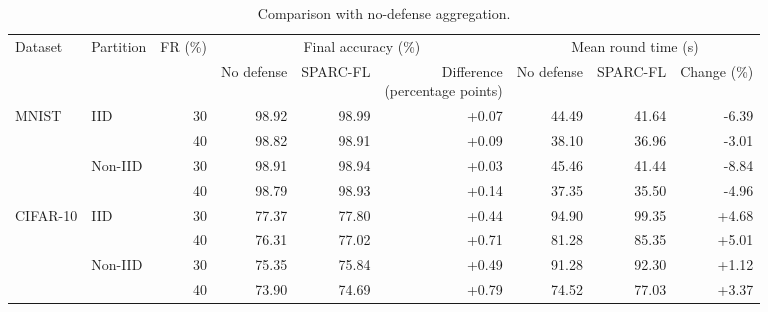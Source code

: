 \begin{table}[t]\centering\footnotesize\setlength{\tabcolsep}{5pt}
\caption{Comparison with no-defense aggregation.}\label{tab:baseline}
\begin{tabular}{llrrrrrrr}\toprule
\multirow{2}{*}{Dataset} & \multirow{2}{*}{Partition} & \multirow{2}{*}{FR (\%)} & \multicolumn{3}{c}{Final accuracy (\%)} & \multicolumn{3}{c}{Mean round time (s)} \\
\cmidrule(lr){4-6}\cmidrule(lr){7-9}
& & & No defense & SPARC-FL & \shortstack{Difference\\(percentage points)} & No defense & SPARC-FL & Change (\%) \\ \midrule
\multirow{4}{*}{MNIST} & \multirow{2}{*}{IID} & 30 & 98.92 & 98.99 & +0.07 & 44.49 & 41.64 & -6.39 \\
 &  & 40 & 98.82 & 98.91 & +0.09 & 38.10 & 36.96 & -3.01 \\
\cmidrule(lr){2-9}
 & \multirow{2}{*}{Non-IID} & 30 & 98.91 & 98.94 & +0.03 & 45.46 & 41.44 & -8.84 \\
 &  & 40 & 98.79 & 98.93 & +0.14 & 37.35 & 35.50 & -4.96 \\
\midrule
\multirow{4}{*}{CIFAR-10} & \multirow{2}{*}{IID} & 30 & 77.37 & 77.80 & +0.44 & 94.90 & 99.35 & +4.68 \\
 &  & 40 & 76.31 & 77.02 & +0.71 & 81.28 & 85.35 & +5.01 \\
\cmidrule(lr){2-9}
 & \multirow{2}{*}{Non-IID} & 30 & 75.35 & 75.84 & +0.49 & 91.28 & 92.30 & +1.12 \\
 &  & 40 & 73.90 & 74.69 & +0.79 & 74.52 & 77.03 & +3.37 \\
\bottomrule\end{tabular}\end{table}
